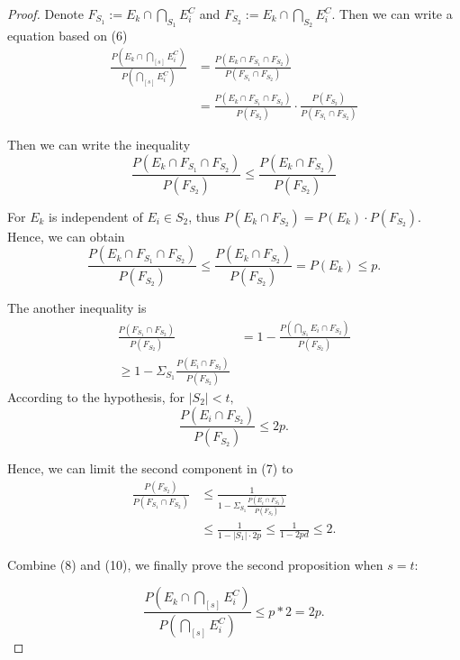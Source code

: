 \begin{proof}
Denote $F_{S_1} := E_k \cap \bigcap_{S_1}E_i^C$ and $F_{S_2} := E_k \cap \bigcap_{S_2}E_i^C.$ Then we can write a equation based on (6)
\begin{equation}
  \begin{aligned}
    \frac{P(E_k \cap \bigcap_{[s]}E_i^C)}{P(\bigcap_{[s]}E_i^C)} &= \frac{P(E_k \cap F_{S_1} \cap F_{S_2})}{P(F_{S_1} \cap F_{S_2})} \\
    &=  \frac{P(E_k \cap F_{S_1} \cap F_{S_2})}{P(F_{S_2})} \cdot \frac{P(F_{S_2})}{P(F_{S_1} \cap F_{S_2})}
  \end{aligned}
\end{equation}

Then we can write the inequality
\begin{equation}
  \nonumber
   \frac{P(E_k \cap F_{S_1} \cap F_{S_2})}{P(F_{S_2})} \leq \frac{P(E_k \cap F_{S_2})}{P(F_{S_2})}
\end{equation}

For $E_k$ is independent of $E_i \in S_2$, thus $P(E_k \cap F_{S_2}) = P(E_k) \cdot P(F_{S_2}).$ Hence, we can obtain
\begin{equation}
  \frac{P(E_k \cap F_{S_1} \cap F_{S_2})}{P(F_{S_2})} \leq \frac{P(E_k \cap F_{S_2})}{P(F_{S_2})} = P(E_k)  \leq p.
\end{equation}

The another inequality is
\begin{equation}
\begin{aligned}
  \frac{P(F_{S_1} \cap F_{S_2})}{P(F_{S_2})} &= 1 - \frac{P(\bigcap_{S_1}E_i \cap F_{S_2})}{P(F_{S_2})}\\
  \geq 1- \Sigma_{S_1}\frac{P(E_i \cap F_{S_2})}{P(F_{S_2})}
\end{aligned}
\end{equation}
  According to the hypothesis, for $|S_2| < t,$ 
  $$\frac{P(E_i \cap F_{S_2})}{P(F_{S_2})} \leq 2p.$$
  
  Hence, we can limit  the second component in (7) to
  \begin{equation}
  \begin{aligned}
    \frac{P(F_{S_2})}{P(F_{S_1} \cap F_{S_2})} &\leq \frac{1}{1- \Sigma_{S_1}\frac{P(E_i \cap F_{S_2})}{P(F_{S_2})}}\\
    &\leq \frac{1}{1-|S_1|\cdot2p} \leq \frac{1}{1-2pd} \leq 2.
  \end{aligned}
  \end{equation}
    
    Combine (8) and (10), we finally prove the second proposition when $s = t$:
    
    $$\frac{P(E_k \cap \bigcap_{[s]}E_i^C)}{P(\bigcap_{[s]}E_i^C)} \leq p * 2 = 2p.$$
    
    \end{proof}
    
